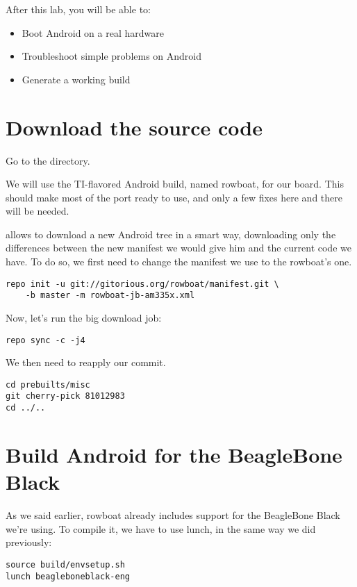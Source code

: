 
After this lab, you will be able to:
\begin{itemize}
  \item Boot Android on a real hardware
  \item Troubleshoot simple problems on Android
  \item Generate a working build
\end{itemize}

\section{Download the source code}

Go to the  directory.

We will use the TI-flavored Android build, named rowboat, for our
board. This should make most of the port ready to use, and only a few
fixes here and there will be needed.

 allows to download a new Android tree in a smart way,
downloading only the differences between the new manifest we would
give him and the current code we have. To do so, we first need to
change the manifest we use to the rowboat's one.

\begin{verbatim}
repo init -u git://gitorious.org/rowboat/manifest.git \
    -b master -m rowboat-jb-am335x.xml
\end{verbatim}

Now, let's run the big download job:
\begin{verbatim}
repo sync -c -j4
\end{verbatim}

We then need to reapply our  commit.
\begin{verbatim}
cd prebuilts/misc
git cherry-pick 81012983
cd ../..
\end{verbatim}

\section{Build Android for the BeagleBone Black}

As we said earlier, rowboat already includes support for the
BeagleBone Black we're using. To compile it, we have to use lunch, in
the same way we did previously:

\begin{verbatim}
source build/envsetup.sh
lunch beagleboneblack-eng
\end{verbatim}

